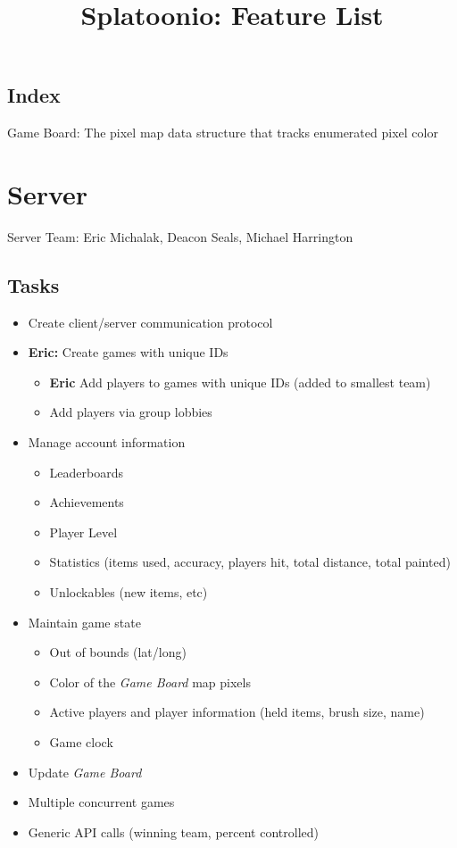\documentclass{article}
\title{Splatoonio: Feature List}
\author{}
\date{\vspace{-5ex}} %
\begin{document}
\maketitle
\tableofcontents

\subsection*{Index}
Game Board: The pixel map data structure that tracks enumerated pixel color

\newpage
\section{Server}
Server Team: Eric Michalak, Deacon Seals, Michael Harrington
\subsection{Tasks}
\begin{itemize}
\item Create client/server communication protocol
\item \textbf{Eric:} Create games with unique IDs
\begin{itemize}
	\item \textbf{Eric} Add players to games with unique IDs (added to smallest team)
	\item Add players via group lobbies
\end{itemize}
\item Manage account information
	\begin{itemize}
	\item Leaderboards
    \item Achievements
    \item Player Level
    \item Statistics (items used, accuracy, players hit, total distance, total painted)
    \item Unlockables (new items, etc)
	\end{itemize}
\item Maintain game state
	\begin{itemize}
	\item Out of bounds (lat/long)
    \item Color of the \emph{Game Board} map pixels
    \item Active players and player information (held items, brush size, name)
    \item Game clock
	\end{itemize}
\item Update \emph{Game Board}
\item Multiple concurrent games
\item Generic API calls (winning team, percent controlled)
\end{itemize}
\end{document}
